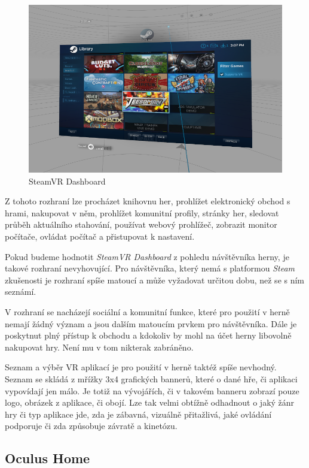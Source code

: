 \begin{figure}[h!]
\centering
\includegraphics[width=12cm]{src/assets/steamvr-library.png}
\caption{SteamVR Dashboard}
\end{figure}

Z tohoto rozhraní lze procházet knihovnu her, prohlížet elektronický
obchod s hrami, nakupovat v něm, prohlížet komunitní profily, stránky
her, sledovat průběh aktuálního stahování, používat webový prohlížeč,
zobrazit monitor počítače, ovládat počítač a přistupovat k nastavení.

Pokud budeme hodnotit \emph{SteamVR Dashboard} z pohledu návštěvníka
herny, je takové rozhraní nevyhovující. Pro návštěvníka, který nemá s
platformou \emph{Steam} zkušenosti je rozhraní spíše matoucí a může
vyžadovat určitou dobu, než se s ním seznámí. 

V rozhraní se nacházejí
sociální a komunitní funkce, které pro použití v herně nemají žádný
význam a jsou dalším matoucím prvkem pro návštěvníka. Dále je poskytnut
plný přístup k obchodu a kdokoliv by mohl na účet herny libovolně
nakupovat hry. Není mu v tom nikterak zabráněno.

Seznam a výběr VR aplikací je pro použití v herně taktéž spíše nevhodný.
Seznam se skládá z mřížky 3x4 grafických bannerů, které o dané hře, či aplikaci 
vypovídají jen málo. Je totiž na vývojářích, či v takovém banneru
zobrazí pouze logo, obrázek z aplikace, či obojí. Lze tak velmi obtížně
odhadnout o jaký žánr hry či typ aplikace jde, zda je zábavná, vizuálně přitažlivá, jaké
ovládání podporuje či zda způsobuje závratě a kinetózu.

\subsection{Oculus Home}\label{oculus-home}

